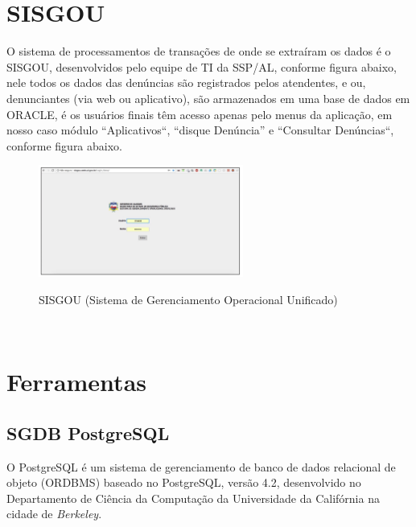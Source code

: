 \section{SISGOU}

O sistema de processamentos de transa\c{c}\~{o}es de onde se extra\'{i}ram os dados \'{e} o SISGOU, desenvolvidos pelo equipe de TI da SSP/AL, conforme figura abaixo, nele todos os dados das denúncias s\~{a}o registrados pelos atendentes, e ou, denunciantes (via web ou aplicativo), s\~{a}o armazenados em uma base de dados em ORACLE, \'{e} os usu\'{a}rios finais têm acesso apenas pelo menus da aplica\c{c}\~{a}o, em nosso caso m\'{o}dulo ``Aplicativos``, ``disque Den\'{u}ncia'' e ``Consultar Den\'{u}ncias``, conforme figura abaixo.

\begin{figure}[H]
	\vspace*{0,2cm}
    \centering
    \caption{SISGOU (Sistema de Gerenciamento Operacional Unificado)}
    \includegraphics[width=0.6\textwidth]{./04-figuras/figura-13}
    \label{fig:ilustfig13}
\end{figure}
\vspace*{-0,9cm}
{\raggedright {}}\\


\section{Ferramentas}


\subsection{SGDB PostgreSQL}

O PostgreSQL \'{e} um sistema de gerenciamento de banco de dados relacional de objeto (ORDBMS) baseado no 
PostgreSQL, vers\~{a}o 4.2, desenvolvido no Departamento de Ci\^{e}ncia da Computa\c{c}\~{a}o da Universidade da Calif\'ornia na cidade de \textit{Berkeley}. 

